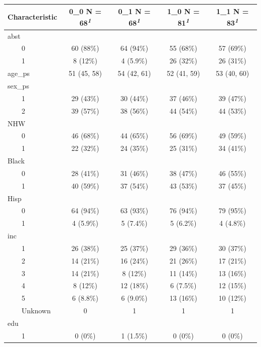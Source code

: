 \documentclass[
  letterpaper,
  DIV=11,
  numbers=noendperiod]{scrartcl}
\begin{document}
\begingroup
\fontsize{12.0pt}{14.4pt}\selectfont
\setlength{\LTpost}{0mm}
\begin{longtable*}{lcccc}
\toprule
\textbf{Characteristic} & \textbf{0\_0}  N = 68\textsuperscript{\textit{1}} & \textbf{0\_1}  N = 68\textsuperscript{\textit{1}} & \textbf{1\_0}  N = 81\textsuperscript{\textit{1}} & \textbf{1\_1}  N = 83\textsuperscript{\textit{1}} \\ 
\midrule\addlinespace[2.5pt]
abst &  &  &  &  \\ 
    0 & 60 (88\%) & 64 (94\%) & 55 (68\%) & 57 (69\%) \\ 
    1 & 8 (12\%) & 4 (5.9\%) & 26 (32\%) & 26 (31\%) \\ 
age\_ps & 51 (45, 58) & 54 (42, 61) & 52 (41, 59) & 53 (40, 60) \\ 
sex\_ps &  &  &  &  \\ 
    1 & 29 (43\%) & 30 (44\%) & 37 (46\%) & 39 (47\%) \\ 
    2 & 39 (57\%) & 38 (56\%) & 44 (54\%) & 44 (53\%) \\ 
NHW &  &  &  &  \\ 
    0 & 46 (68\%) & 44 (65\%) & 56 (69\%) & 49 (59\%) \\ 
    1 & 22 (32\%) & 24 (35\%) & 25 (31\%) & 34 (41\%) \\ 
Black &  &  &  &  \\ 
    0 & 28 (41\%) & 31 (46\%) & 38 (47\%) & 46 (55\%) \\ 
    1 & 40 (59\%) & 37 (54\%) & 43 (53\%) & 37 (45\%) \\ 
Hisp &  &  &  &  \\ 
    0 & 64 (94\%) & 63 (93\%) & 76 (94\%) & 79 (95\%) \\ 
    1 & 4 (5.9\%) & 5 (7.4\%) & 5 (6.2\%) & 4 (4.8\%) \\ 
inc &  &  &  &  \\ 
    1 & 26 (38\%) & 25 (37\%) & 29 (36\%) & 30 (37\%) \\ 
    2 & 14 (21\%) & 16 (24\%) & 21 (26\%) & 17 (21\%) \\ 
    3 & 14 (21\%) & 8 (12\%) & 11 (14\%) & 13 (16\%) \\ 
    4 & 8 (12\%) & 12 (18\%) & 6 (7.5\%) & 12 (15\%) \\ 
    5 & 6 (8.8\%) & 6 (9.0\%) & 13 (16\%) & 10 (12\%) \\ 
    Unknown & 0 & 1 & 1 & 1 \\ 
edu &  &  &  &  \\ 
    1 & 0 (0\%) & 1 (1.5\%) & 0 (0\%) & 0 (0\%) \\ 

\end{longtable*}
\end{document}
